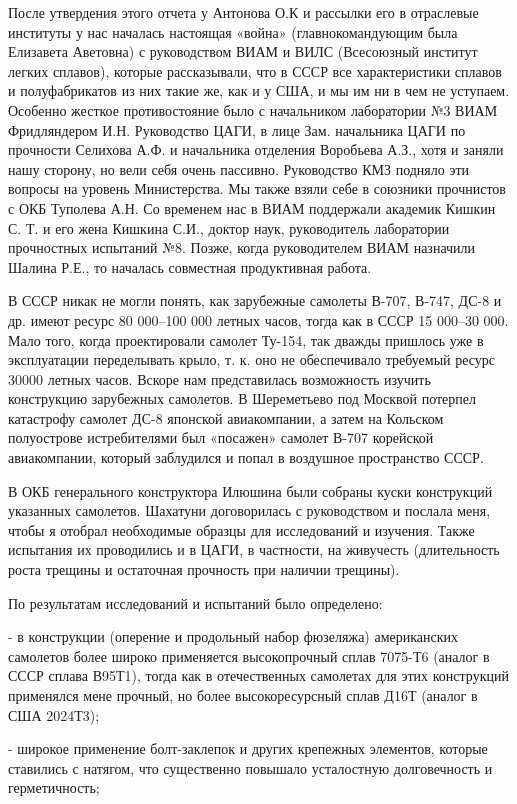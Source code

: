 После утвердения этого отчета у Антонова О.К и рассылки его в отраслевые
институты у нас началась настоящая «война» (главнокомандующим была Елизавета
Аветовна) с руководством ВИАМ и ВИЛС (Всесоюзный институт легких сплавов),
которые рассказывали, что в СССР все характеристики сплавов и полуфабрикатов из
них такие же, как и у США, и мы им ни в чем не уступаем. Особенно жесткое
противостояние было с начальником лаборатории №3 ВИАМ Фридляндером И.Н.
Руководство ЦАГИ, в лице Зам. начальника ЦАГИ по прочности Селихова А.Ф. и
начальника отделения Воробьева А.З., хотя и заняли нашу сторону, но вели себя
очень пассивно. Руководство КМЗ подняло эти вопросы на уровень Министерства. Мы
также взяли себе в союзники прочнистов с ОКБ Туполева А.Н. Со временем нас в
ВИАМ поддержали академик Кишкин С. Т. и его жена Кишкина С.И., доктор наук,
руководитель лаборатории прочностных испытаний №8. Позже, когда руководителем
ВИАМ назначили Шалина Р.Е., то началась совместная продуктивная работа.

В СССР никак не могли понять, как зарубежные самолеты В-707, В-747, ДС-8 и др.
имеют ресурс 80 000–100 000 летных часов, тогда как в СССР 15 000–30 000. Мало
того, когда проектировали самолет Ту-154, так дважды пришлось уже в
эксплуатации переделывать крыло, т. к. оно не обеспечивало требуемый ресурс
30000 летных часов. Вскоре нам представилась возможность изучить конструкцию
зарубежных самолетов. В Шереметьево под Москвой потерпел катастрофу самолет
ДС-8 японской авиакомпании, а затем на Кольском полуострове истребителями был
«посажен» самолет В-707 корейской авиакомпании, который заблудился и попал в
воздушное пространство СССР.

В ОКБ генерального конструктора Илюшина были собраны куски конструкций
указанных самолетов. Шахатуни договорилась с руководством и послала меня, чтобы
я отобрал необходимые образцы для исследований и изучения. Также испытания их
проводились и в ЦАГИ, в частности, на живучесть (длительность роста трещины и
остаточная прочность при наличии трещины).

По результатам исследований и испытаний было определено:

- в конструкции (оперение и продольный набор фюзеляжа) американских самолетов
более широко применяется высокопрочный сплав 7075-Т6 (аналог в СССР сплава
В95Т1), тогда как в отечественных самолетах для этих конструкций применялся
мене прочный, но более высокоресурсный сплав Д16Т (аналог в США 2024Т3);

- широкое применение болт-заклепок и других крепежных элементов, которые
ставились с натягом, что существенно повышало усталостную долговечность и
герметичность;

